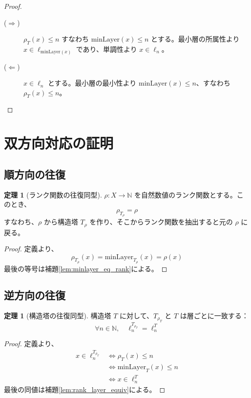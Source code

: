 \documentclass[a4paper,11pt]{ltjsarticle}
\theoremstyle{definition}
\newtheorem{theorem}[definition]{定理}
\begin{document}
\begin{proof}
\begin{description}
\item[($\Rightarrow$)] $\rho_T(x) \leq n$ すなわち $\mathrm{minLayer}(x) \leq n$ とする。最小層の所属性より $x \in \ell_{\mathrm{minLayer}(x)}$ であり、単調性より $x \in \ell_n$。
\item[($\Leftarrow$)] $x \in \ell_n$ とする。最小層の最小性より $\mathrm{minLayer}(x) \leq n$、すなわち $\rho_T(x) \leq n$。
\end{description}
\end{proof}

\section{双方向対応の証明}

\subsection{順方向の往復}

\begin{theorem}[ランク関数の往復同型]\label{thm:rank_roundtrip}
$\rho : X \to \mathbb{N}$ を自然数値のランク関数とする。このとき、
\[
\rho_{T_\rho} = \rho
\]
すなわち、$\rho$ から構造塔 $T_\rho$ を作り、そこからランク関数を抽出すると元の $\rho$ に戻る。
\end{theorem}

\begin{proof}
定義より、
\[
\rho_{T_\rho}(x) = \mathrm{minLayer}_{T_\rho}(x) = \rho(x)
\]
最後の等号は補題\ref{lem:minlayer_eq_rank}による。
\end{proof}

\subsection{逆方向の往復}

\begin{theorem}[構造塔の往復同型]\label{thm:tower_roundtrip}
構造塔 $T$ に対して、$T_{\rho_T}$ と $T$ は層ごとに一致する：
\[
\forall n \in \mathbb{N}, \quad \ell^{T_{\rho_T}}_n = \ell^T_n
\]
\end{theorem}

\begin{proof}
定義より、
\begin{align*}
x \in \ell^{T_{\rho_T}}_n
&\Leftrightarrow \rho_T(x) \leq n \\
&\Leftrightarrow \mathrm{minLayer}_T(x) \leq n \\
&\Leftrightarrow x \in \ell^T_n
\end{align*}
最後の同値は補題\ref{lem:rank_layer_equiv}による。
\end{proof}
\end{document}
